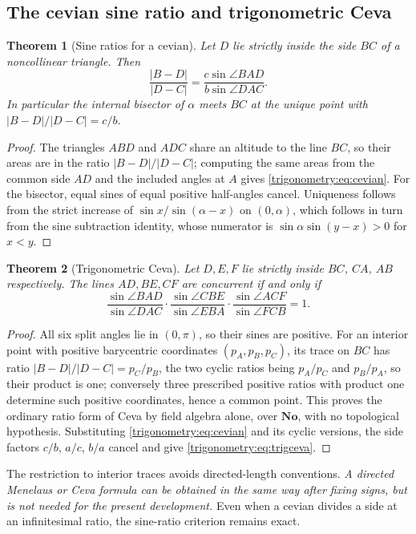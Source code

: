 \documentclass[11pt,letterpaper]{article}
\numberwithin{equation}{section}
\newtheorem{theorem}{Theorem}[section]
\theoremstyle{definition}
\theoremstyle{remark}
\newcommand{\No}{\mathbf{No}}
\begin{document}
\subsection{The cevian sine ratio and trigonometric Ceva}
\begin{theorem}[Sine ratios for a cevian]\label{trigonometry:thm:cevian}
Let $D$ lie strictly inside the side $BC$ of a noncollinear triangle. Then
\begin{equation}\label{trigonometry:eq:cevian}
 \frac{|B-D|}{|D-C|}=\frac{c\sin\angle BAD}{b\sin\angle DAC}.
\end{equation}
In particular the internal bisector of $\alpha$ meets $BC$ at the unique point with
$|B-D|/|D-C|=c/b$.
\end{theorem}
\begin{proof}
The triangles $ABD$ and $ADC$ share an altitude to the line $BC$, so their areas are in the ratio
$|B-D|/|D-C|$; computing the same areas from the common side $AD$ and the included angles at $A$
gives \cref{trigonometry:eq:cevian}. For the bisector, equal sines of equal positive half-angles
cancel. Uniqueness follows from the strict increase of $\sin x/\sin(\alpha-x)$ on $(0,\alpha)$,
which follows in turn from the sine subtraction identity, whose numerator is
$\sin\alpha\sin(y-x)>0$ for $x<y$.
\end{proof}

\begin{theorem}[Trigonometric Ceva]\label{trigonometry:thm:ceva}
Let $D,E,F$ lie strictly inside $BC$, $CA$, $AB$ respectively. The lines $AD,BE,CF$ are concurrent
if and only if
\begin{equation}\label{trigonometry:eq:trigceva}
 \frac{\sin\angle BAD}{\sin\angle DAC}\cdot
 \frac{\sin\angle CBE}{\sin\angle EBA}\cdot
 \frac{\sin\angle ACF}{\sin\angle FCB}=1.
\end{equation}
\end{theorem}
\begin{proof}
All six split angles lie in $(0,\pi)$, so their sines are positive. For an interior point with
positive barycentric coordinates $(p_A,p_B,p_C)$, its trace on $BC$ has ratio
$|B-D|/|D-C|=p_C/p_B$, the two cyclic ratios being $p_A/p_C$ and $p_B/p_A$, so their product is
one; conversely three prescribed positive ratios with product one determine such positive
coordinates, hence a common point. This proves the ordinary ratio form of Ceva by field algebra
alone, over $\No$, with no topological hypothesis. Substituting \cref{trigonometry:eq:cevian} and
its cyclic versions, the side factors $c/b$, $a/c$, $b/a$ cancel and give
\cref{trigonometry:eq:trigceva}.
\end{proof}
The restriction to interior traces avoids directed-length conventions. \emph{A directed Menelaus or
Ceva formula can be obtained in the same way after fixing signs, but is not needed for the present
development.} Even when a cevian divides a side at an infinitesimal ratio, the sine-ratio criterion
remains exact.
\end{document}

